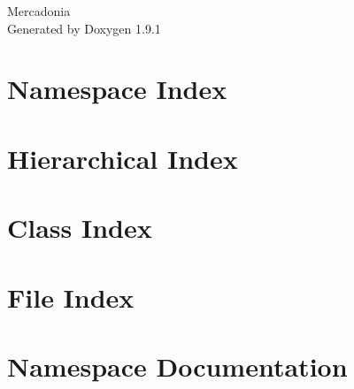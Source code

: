 \let\mypdfximage\pdfximage\def\pdfximage{\immediate\mypdfximage}\documentclass[twoside]{book}
\newcommand{\+}{\discretionary{\mbox{\scriptsize$\hookleftarrow$}}{}{}}
\newcommand{\clearemptydoublepage}{%
  \newpage{\pagestyle{empty}\cleardoublepage}%
}
\begin{document}
\raggedbottom

\hypersetup{pageanchor=false,
             bookmarksnumbered=true,
             pdfencoding=unicode
            }
\begin{titlepage}
\vspace*{7cm}
\begin{center}%
{\Large Mercadonia }\\
\vspace*{1cm}
{\large Generated by Doxygen 1.9.1}\\
\end{center}
\end{titlepage}
\clearemptydoublepage
{}
\tableofcontents
\clearemptydoublepage
{}
\hypersetup{pageanchor=true}

\chapter{Namespace Index}

\chapter{Hierarchical Index}

\chapter{Class Index}

\chapter{File Index}

\chapter{Namespace Documentation}





\end{document}
